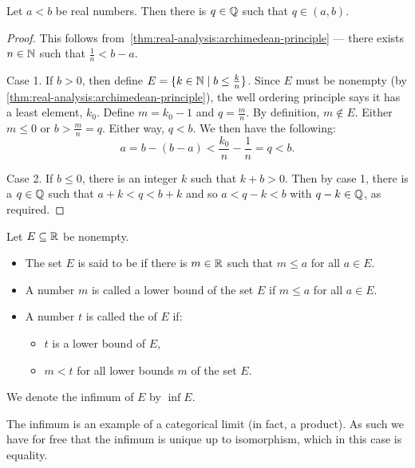 \begin{theorem}\label{thm:real-analysis:density-of-rational-numbers}
  Let \(a < b\) be real numbers. Then there is \(q \in \mathbb{Q}\) such that \(q \in (a,b)\).
\end{theorem}

\begin{proof}
  This follows from~\ref{thm:real-analysis:archimedean-principle} --- there exists \(n \in \mathbb{N}\) such that \(\frac 1 n < b - a\).

  Case 1. If \(b > 0\), then define \(E = \{k \in \mathbb{N} \mid b \leq \frac k n \}\). Since \(E\) must be nonempty (by \ref{thm:real-analysis:archimedean-principle}), the well ordering principle says it has a least element, \(k_{0}\). Define \(m = k_{0} - 1\) and \(q = \frac m n\). By definition, \(m \not \in E\). Either \(m \leq 0\) or \(b > \frac m n = q\). Either way, \(q < b\). We then have the following:
  \[a = b - (b - a) < \frac{k_{0}}{n} - \frac 1 n = q < b.\]

  Case 2. If \(b \leq 0\), there is an integer \(k\) such that \(k + b > 0\). Then by case 1, there is a \(q \in \mathbb{Q}\) such that \(a + k < q < b +k\) and so \(a < q - k < b\) with \(q -k \in \mathbb{Q}\), as required.
\end{proof}

\begin{definition}
  Let \(E \subseteq \mathbb{R}\) be nonempty.
  \begin{itemize}
    \item The set \(E\) is said to be  if there is \(m \in \mathbb{R}\) such that \(m \leq a\) for all \(a \in E\).
    \item A number \(m\) is called a lower bound of the set \(E\) if \(m \leq a\) for all \(a \in E\).
    \item  A number \(t\) is called the  of \(E\) if:
      \begin{itemize}
        \item \(t\) is a lower bound of \(E\),
        \item \(m < t\) for all lower bounds \(m\) of the set \(E\).
      \end{itemize}
  \end{itemize}

  We denote the infimum of \(E\) by \(\inf E\).
\end{definition}

\begin{categorybox}
  The infimum is an example of a categorical limit (in fact, a product). As such we have for free that the infimum is unique up to isomorphism, which in this case is equality.
\end{categorybox}

